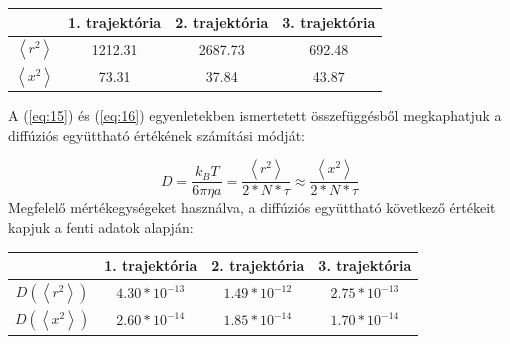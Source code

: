 \begin{center}
\label{tab:5}
\begin{tabular}{||c|c|c|c||}
    \toprule
                            & 1. trajektória  & 2. trajektória  & 3. trajektória  \\ \hline \hline
    $\left< r^{2} \right>$  & 1212.31         & 2687.73         & 692.48          \\ \hline
    $\left< x^{2} \right>$  & 73.31           & 37.84           & 43.87           \\
    \bottomrule
\end{tabular}
\end{center}
A (\ref{eq:15}) és (\ref{eq:16}) egyenletekben ismertetett összefüggésből megkaphatjuk a diffúziós együttható értékének számítási módját:

\begin{equation} \label{eq:17}
    D
    =
    \frac{k_{B} T}{6 \pi \eta a}
    =
    \frac{\left< r^{2} \right>}{2 * N * \tau}
    \approx
    \frac{\left< x^{2} \right>}{2 * N * \tau}
\end{equation}
Megfelelő mértékegységeket használva, a diffúziós együttható következő értékeit kapjuk a fenti adatok alapján:

\begin{center}
\label{tab:6}
\begin{tabular}{||c|c|c|c||}
    \toprule
                                             & 1. trajektória  & 2. trajektória  & 3. trajektória  \\ \hline \hline
    $D \left( \left< r^{2} \right> \right)$  & $4.30*10^{-13}$ & $1.49*10^{-12}$ & $2.75*10^{-13}$ \\ \hline
    $D \left( \left< x^{2} \right> \right)$  & $2.60*10^{-14}$ & $1.85*10^{-14}$ & $1.70*10^{-14}$ \\
    \bottomrule
\end{tabular}
\end{center}